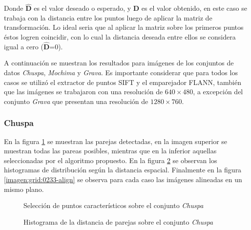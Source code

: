 Donde $\hat{\mathbf{D}}$ es el valor deseado o esperado, y $\mathbf{D}$ es el valor obtenido, en este caso se trabaja con la distancia entre los puntos luego de aplicar la matriz de transformación. Lo ideal seria que al aplicar la matriz sobre los primeros puntos éstos logren coincidir, con lo cual la distancia deseada entre ellos se considera igual a cero ($\hat{\mathbf{D}}$=0).

A continuación se muestran los resultados para imágenes de los conjuntos de datos \textit{Chuspa}, \textit{Mochima} y \textit{Grava}. Es importante considerar que para todos los casos se utilizó el extractor de puntos SIFT y el emparejador FLANN, también que las imágenes se trabajaron con una resolución de $640 \times 480$, a excepción del conjunto \textit{Grava} que presentan una resolución de $1280 \times 760$.

\subsubsection*{Chuspa}

En la figura \ref{imagen:grid:0233-match} se muestran las parejas detectadas, en la imagen superior se muestran todas las pareas posibles, mientras que en la inferior aquellas seleccionadas por el algoritmo propuesto. En la figura \ref{imagen:grid:0233-hist} se observan los histogramas de distribución según la distancia espacial. Finalmente en la figura \ref{imagen:grid:0233-align} se observa para cada caso las imágenes alineadas en un mismo plano.

\begin{figure}[h]
	\centering     %
	\hspace{1mm}%
	
	\caption[Selección de puntos caracteristicos sobre el conjunto \textit{Chuspa}]{Selección de puntos característicos sobre el conjunto \textit{Chuspa}}
	\label{imagen:grid:0233-match}
\end{figure}

\begin{figure}[h]
	\centering     %
	\hspace{3mm}%
	
	\caption[Histograma de la distancia de parejas sobre el conjunto \textit{Chuspa}]{Histograma de la distancia de parejas sobre el conjunto \textit{Chuspa}}
	\label{imagen:grid:0233-hist}
\end{figure}

